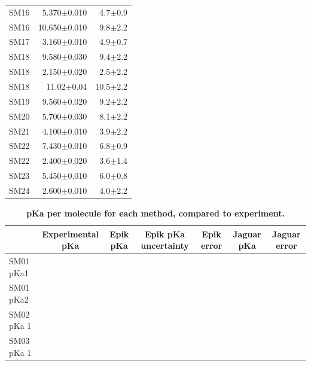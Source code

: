 \documentclass[9pt,lineno]{elife}
\begin{document}
\begin{table}
\begin{tabular}{lrr}
    SM16 &      5.370$\pm$0.010 &            4.7$\pm$0.9 \\
    SM16 &     10.650$\pm$0.010 &            9.8$\pm$2.2 \\
    SM17 &      3.160$\pm$0.010 &            4.9$\pm$0.7 \\
    SM18 &      9.580$\pm$0.030 &            9.4$\pm$2.2 \\
    SM18 &      2.150$\pm$0.020 &            2.5$\pm$2.2 \\
    SM18 &       11.02$\pm$0.04 &           10.5$\pm$2.2 \\
    SM19 &      9.560$\pm$0.020 &            9.2$\pm$2.2 \\
    SM20 &      5.700$\pm$0.030 &            8.1$\pm$2.2 \\
    SM21 &      4.100$\pm$0.010 &            3.9$\pm$2.2 \\
    SM22 &      7.430$\pm$0.010 &            6.8$\pm$0.9 \\
    SM22 &      2.400$\pm$0.020 &            3.6$\pm$1.4 \\
    SM23 &      5.450$\pm$0.010 &            6.0$\pm$0.8 \\
    SM24 &      2.600$\pm$0.010 &            4.0$\pm$2.2 \\
\bottomrule
\end{tabular}

\end{table}

\begin{table}[H]
\centering
\caption{{\bf pKa per molecule for each method, compared to experiment.}}
\label{tab:molecule-macro}
\begin{tabular}{l|llllll}
           & \multicolumn{1}{c}{Experimental pKa} & \multicolumn{1}{c}{Epik pKa} & \multicolumn{1}{c}{Epik pKa uncertainty} & \multicolumn{1}{c}{Epik error} & \multicolumn{1}{c}{Jaguar pKa} & \multicolumn{1}{c}{Jaguar error} \\ \hline
SM01 pKa1  &                                      &                              &                                          &                                &                                &                                  \\
SM01 pKa2  &                                      &                              &                                          &                                &                                &                                  \\
SM02 pKa 1 &                                      &                              &                                          &                                &                                &                                  \\
SM03 pKa 1 &                                      &                              &                                          &                                &                                &                                 
\end{tabular}
\end{table}
\end{document}
